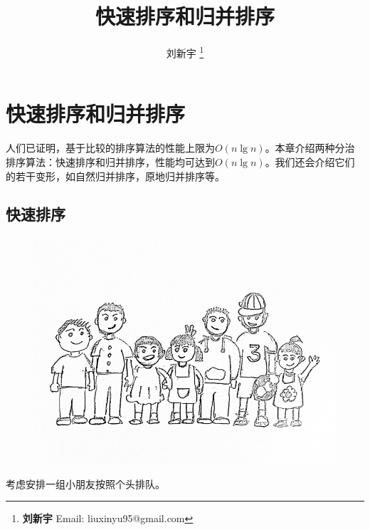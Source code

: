 \documentclass[b5paper]{ctexart}
\begin{document}
\title{快速排序和归并排序}

\author{刘新宇
\thanks{{\bfseries 刘新宇 } \newline
  Email: liuxinyu95@gmail.com \newline}
  }

\maketitle
\fi


\ifx\wholebook\relax
\chapter{快速排序和归并排序}
\fi

人们已证明，基于比较的排序算法的性能上限为$O(n \lg n)$\cite{TAOCP}。本章介绍两种分治排序算法：快速排序和归并排序，性能均可达到$O(n \lg n)$。我们还会介绍它们的若干变形，如自然归并排序，原地归并排序等。

\section{快速排序}

\begin{figure}[htbp]
 \centering
 \includegraphics[scale=0.3]{img/kids}
 \captionsetup{labelformat=empty}
 \label{fig:knuth-ssort}
\end{figure}

考虑安排一组小朋友按照个头排队。
\end{document}
